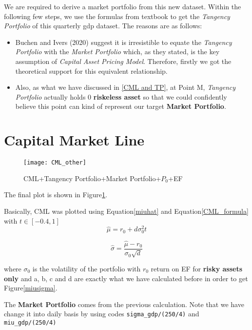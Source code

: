 \documentclass[
]{article}
\begin{document}
We are required to derive a market portfolio from this new dataset.
Within the following few steps, we use the formulas from textbook to get
the \emph{Tangency Portfolio} of this quarterly gdp dataset. The reasons
are as follows:

\begin{itemize}
\item
  Buchen and Ivers (2020) suggest it is irresistible to equate the
  \emph{Tangency Portfolio} with the \emph{Market Portfolio} which, as
  they stated, is the key assumption of \emph{Capital Asset Pricing
  Model}. Therefore, firstly we got the theoretical support for this
  equivalent relationship.
\item
  Also, as what we have discussed in \ref{CML and TP}, at Point M,
  \emph{Tangency Portfolio} actually holds 0 \textbf{riskeless asset} so
  that we could confidently believe this point can kind of represent our
  target \textbf{Market Portfolio}.
\end{itemize}

\hypertarget{capital-market-line}{%
\section{Capital Market Line}\label{capital-market-line}}

\begin{figure}[!htb]
\texttt{[image: CML\_other]}
\caption{CML+Tangency Portfolio+Market Portfolio+$P_0$+EF}\label{CML_other}
\end{figure}

The final plot is shown in Figure\ref{CML_other}.

Basically, CML was plotted using Equation\ref{miuhat} and
Equation\ref{CML_formula} with \(t \in [-0.4,1]\) \begin{equation}
\hat\mu = r_0 + d\sigma_0^2t
\label{miuhat}
\end{equation}

\begin{equation}
\hat\sigma = \frac{\hat\mu - r_0}{\sigma_0\sqrt{d}}
\label{CML_formula}
\end{equation}

where \(\sigma_0\) is the volatility of the portfolio with \(r_0\)
return on EF for \textbf{risky assets only} and a, b, c and d are
exactly what we have calculated before in order to get
Figure\ref{miusigma}.

The \textbf{Market Portfolio} comes from the previous calculation. Note
that we have change it into daily basis by using codes
\texttt{sigma\_gdp/(250/4)} and \texttt{miu\_gdp/(250/4)}
\end{document}
